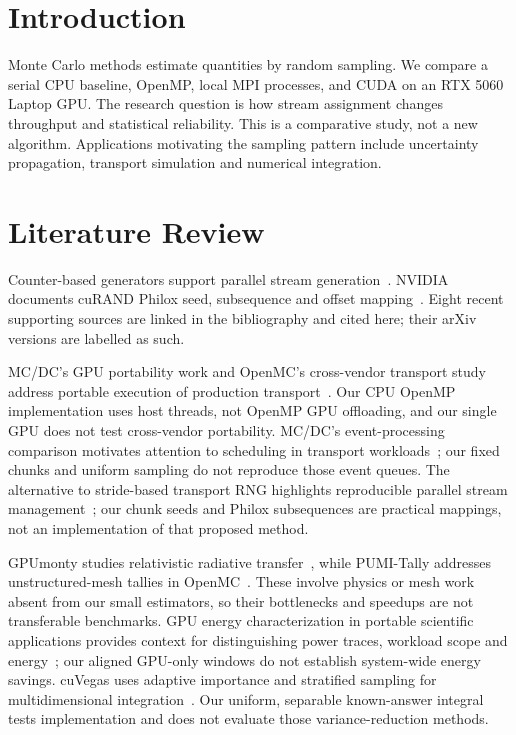 \section{Introduction}
Monte Carlo methods estimate quantities by random sampling. We compare a
serial CPU baseline, OpenMP, local MPI processes, and CUDA on an RTX 5060
Laptop GPU. The research question is how stream assignment changes throughput
and statistical reliability. This is a comparative study, not a new algorithm.
Applications motivating the sampling pattern include uncertainty propagation,
transport simulation and numerical integration.

\section{Literature Review}
Counter-based generators support parallel stream generation~\cite{salmon}.
NVIDIA documents cuRAND Philox seed, subsequence and offset mapping~\cite{curand}.
Eight recent supporting sources are linked in the bibliography and cited here;
their arXiv versions are labelled as such.

MC/DC's GPU portability work and OpenMC's cross-vendor transport study
address portable execution of production transport~\cite{mcdc2025,openmc2024}.
Our CPU OpenMP implementation uses host threads, not OpenMP GPU offloading,
and our single GPU does not test cross-vendor portability.
MC/DC's event-processing comparison motivates attention to scheduling
in transport workloads~\cite{scheduling2025}; our fixed chunks and uniform
sampling do not reproduce those event queues.
The alternative to stride-based transport RNG highlights reproducible parallel
stream management~\cite{rng2024}; our chunk seeds and Philox subsequences
are practical mappings, not an implementation of that proposed method.

GPUmonty studies relativistic radiative transfer~\cite{gpumonty2026}, while
PUMI-Tally addresses unstructured-mesh tallies in OpenMC~\cite{pumi2025}.
These involve physics or mesh work absent from our small estimators, so
their bottlenecks and speedups are not transferable benchmarks.
GPU energy characterization in portable scientific applications provides
context for distinguishing power traces, workload scope and energy~\cite{energy2025};
our aligned GPU-only windows do not establish system-wide energy savings.
cuVegas uses adaptive importance and stratified sampling for multidimensional
integration~\cite{cuvegas2024}. Our uniform, separable known-answer integral
tests implementation and does not evaluate those variance-reduction methods.

